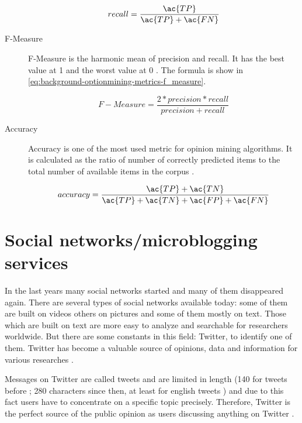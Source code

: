 \begin{description}
		\begin{equation}
			recall = \frac{\ac{TP}}{\ac{TP}+\ac{FN}}
			\label{eq:background-optionmining-metrics-recall}
		\end{equation}

	\item [F-Measure]
		F-Measure is the harmonic mean of precision and recall.
		It has the best value at 1 and the worst value at 0
		\cite{Tripathy2015}.
		The formula is show in \cref{eq:background-optionmining-metrics-f_measure}.

		\begin{equation}
			F-Measure = \frac{2 * precision * recall}{precision + recall}
			\label{eq:background-optionmining-metrics-f_measure}
		\end{equation}

	\item [Accuracy]
		Accuracy is one of the most used metric for opinion mining algorithms.
		It is calculated as the ratio of number of correctly predicted items to the total number of available items in the corpus
		\cite{Tripathy2015}.

		\begin{equation}
			accuracy = \frac{\ac{TP} + \ac{TN}}{\ac{TP}+ \ac{TN} + \ac{FP} + \ac{FN}}
			\label{eq:background-optionmining-metrics-accuracy}
		\end{equation}

\end{description}

\section{Social networks/microblogging services}
\label{s:background-socialnetworks}

In the last years many social networks started and many of them disappeared again.
There are several types of social networks available today: some of them are built on videos others on pictures and some of them mostly on text.
Those which are built on text are more easy to analyze and searchable for researchers worldwide.
But there are some constants in this field: Twitter, to identify one of them.
Twitter has become a valuable source of opinions, data and information for various researches \cite{Barbosa2010}.

Messages on Twitter are called tweets and are limited in length (140 for tweets before ; 280 characters since then, at least for english tweets \cite{Rosen2017}) and due to this fact users have to concentrate on a specific topic precisely.
Therefore, Twitter is the perfect source of the public opinion as users discussing anything on Twitter \cite{Pagolu2016a}.

